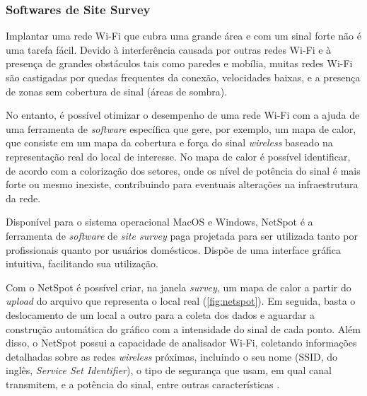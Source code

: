 \subsubsection{Softwares de Site Survey}
\label{subsubsec:softwares-site-survey}

Implantar uma rede Wi-Fi que cubra uma grande área e com um sinal forte não é uma tarefa fácil. Devido à interferência causada por outras redes Wi-Fi e à presença de grandes obstáculos tais como paredes e mobília, muitas redes Wi-Fi são castigadas por quedas frequentes da conexão, velocidades baixas, e a presença de zonas sem cobertura de sinal (áreas de sombra).

No entanto, é possível otimizar o desempenho de uma rede Wi-Fi com a ajuda de uma ferramenta de \textit{software} específica que gere, por exemplo, um mapa de calor, que consiste em um mapa da cobertura e força do sinal \textit{wireless} baseado na representação real do local de interesse. No mapa de calor é possível identificar, de acordo com a colorização dos setores, onde os nível de potência do sinal é mais forte ou mesmo inexiste, contribuindo para eventuais alterações na infraestrutura da rede.

\label{subsubsubsec:netspot}

Disponível para o sistema operacional MacOS e Windows, NetSpot é a ferramenta de \textit{software} de \textit{site survey} paga projetada para ser utilizada tanto por profissionais quanto por usuários domésticos. Dispõe de uma interface gráfica intuitiva, facilitando sua utilização.

Com o NetSpot é possível criar, na janela \textit{survey}, um mapa de calor a partir do \textit{upload} do arquivo que representa o local real (\autoref{fig:netspot}). Em seguida, basta o deslocamento de um local a outro para a coleta dos dados e aguardar a construção automática do gráfico com a intensidade do sinal de cada ponto. Além disso, o NetSpot possui a capacidade de analisador Wi-Fi, coletando informações detalhadas sobre as redes \textit{wireless} próximas, incluindo o seu nome (SSID, do inglês, \textit{Service Set Identifier}), o tipo de segurança que usam, em qual canal transmitem, e a potência do sinal, entre outras características \cite{Netspot2019}.


